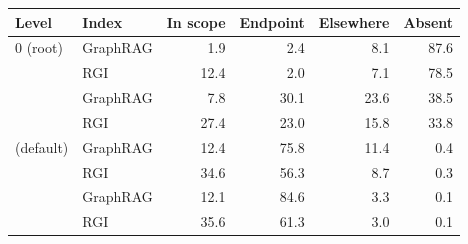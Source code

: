 \begin{tabular}{@{}llrrrr@{}}
\toprule
Level & Index & In scope & Endpoint & Elsewhere & Absent \\
\midrule
0 (root) & GraphRAG & 1.9 & 2.4 & 8.1 & 87.6 \\
 & RGI & 12.4 & 2.0 & 7.1 & 78.5 \\
\addlinespace
1 & GraphRAG & 7.8 & 30.1 & 23.6 & 38.5 \\
 & RGI & 27.4 & 23.0 & 15.8 & 33.8 \\
\addlinespace
2 (default) & GraphRAG & 12.4 & 75.8 & 11.4 & 0.4 \\
 & RGI & 34.6 & 56.3 & 8.7 & 0.3 \\
\addlinespace
3 & GraphRAG & 12.1 & 84.6 & 3.3 & 0.1 \\
 & RGI & 35.6 & 61.3 & 3.0 & 0.1 \\
\bottomrule
\end{tabular}

